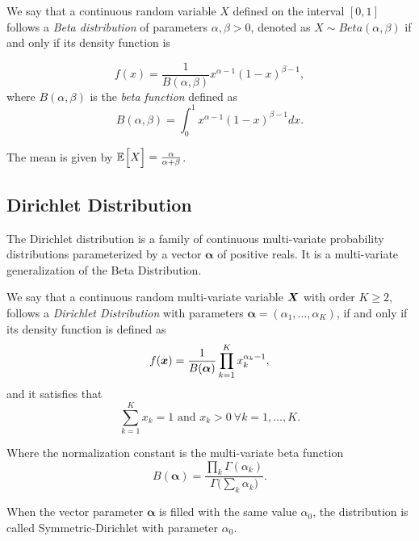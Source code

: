 \begin{definition}
We say that a continuous random variable \(X\) defined on the
interval \([0,1]\) follows a \emph{Beta distribution} of parameters \(\alpha,
\beta > 0\), denoted as \(X \sim Beta(\alpha, \beta)\) if and only if its
density function is

\[
  f(x) = \frac{1}{B(\alpha, \beta)}x^{\alpha - 1}(1-x)^{\beta -1},
\]
where \(B(\alpha, \beta)\) is the \emph{beta function} defined as
\[
  B(\alpha, \beta) = \int_0^1 x^{\alpha - 1}(1-x)^{\beta -1} dx.
\]
\end{definition}

The mean is given by \(\mathbb{E}_{}\Big[X\Big] = \frac{\alpha}{\alpha + \beta}\).

\subsection*{Dirichlet Distribution}

The Dirichlet distribution is a family of continuous multi-variate probability
distributions parameterized by a vector \(\bm{\alpha}\) of positive reals. It is
a multi-variate generalization of the Beta Distribution.

\begin{definition}
  We say that a continuous random multi-variate variable \(\bm{X}\) with order
  \(K \geq 2\), follows a \emph{Dirichlet
    Distribution} with parameters \(\bm{\alpha} = (\alpha_{1}, \dots, \alpha_{K})\), if and
  only if its density function is defined as
  \[
    f(\bm{x}) = \frac{1}{B(\bm{\alpha})}\prod_{k = 1}^{K}x_{k}^{\alpha_{k}-1},
  \]
  and it satisfies that
  \[
    \sum_{k=1}^{K} x_{k} = 1 \text{ and } x_{k} > 0 \ \forall k=1,\dots,K.
  \]
\end{definition}

Where the normalization constant is the multi-variate beta function
\[
  B(\bm{\alpha}) = \frac{\prod_{k} \Gamma (\alpha_{k})}{\Gamma \big( \sum_{k}\alpha_{k} \big)}.
\]

When the vector parameter \(\bm{\alpha}\) is filled with the same value \(\alpha_{0}\), the distribution is called Symmetric-Dirichlet with parameter \(\alpha_{0}\).


